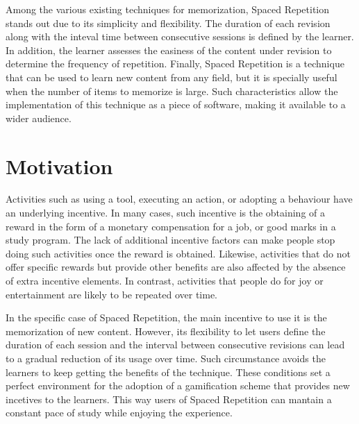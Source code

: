 Among the various existing techniques for memorization, Spaced Repetition stands out due to its simplicity and flexibility. The duration of each revision along with the inteval time between consecutive sessions is defined by the learner. In addition, the learner assesses the easiness of the content under revision to determine the frequency of repetition. Finally, Spaced Repetition is a technique that can be used to learn new content from any field, but it is specially useful when the number of items to memorize is large. Such characteristics allow the implementation of this technique as a piece of software, making it available to a wider audience.

\section{Motivation}
Activities such as using a tool, executing an action, or adopting a behaviour have an underlying incentive. In many cases, such incentive is the obtaining of a reward in the form of a monetary compensation for a job, or good marks in a study program. The lack of additional incentive factors can make people stop doing such activities once the reward is obtained. Likewise, activities that do not offer specific rewards but provide other benefits are also affected by the absence of extra incentive elements. In contrast, activities that people do for joy or entertainment are likely to be repeated over time. 

In the specific case of Spaced Repetition, the main incentive to use it is the memorization of new content. However, its flexibility to let users define the duration of each session and the interval between consecutive revisions can lead to a gradual reduction of its usage over time. Such circumstance avoids the learners to keep getting the benefits of the technique. These conditions set a perfect environment for the adoption of a gamification scheme that provides new incetives to the learners. This way users of Spaced Repetition can mantain a constant pace of study while enjoying the experience.
